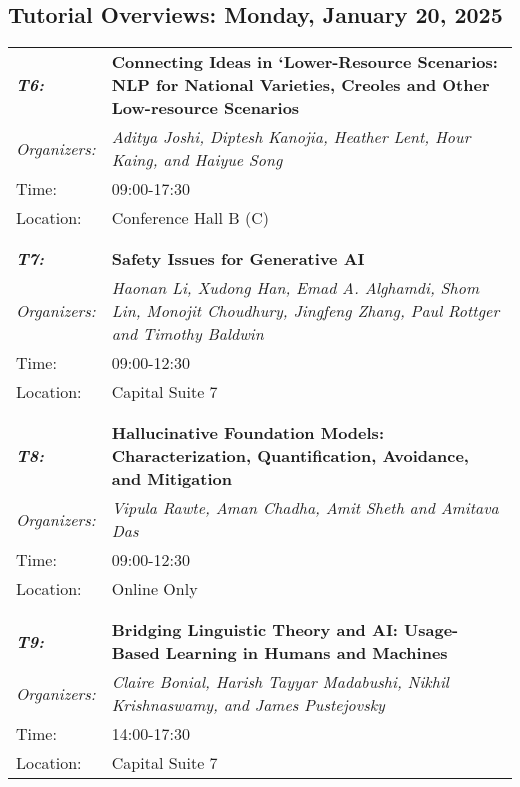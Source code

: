 \subsection{Tutorial Overviews: Monday, January 20, 2025}
\begin{longtable}{p{15mm}p{100mm}}
\emph{\textbf{T6:}} & \textbf{Connecting Ideas in ‘Lower-Resource Scenarios: NLP for National Varieties, Creoles and Other Low-resource Scenarios} \\
\emph{Organizers:} & \emph{Aditya Joshi, Diptesh Kanojia, Heather Lent, Hour Kaing, and Haiyue Song} \\
Time: & 09:00-17:30 \\
Location: & Conference Hall B (C) \\\\
\hline\\
\emph{\textbf{T7:}} & \textbf{Safety Issues for Generative AI} \\
\emph{Organizers:} & \emph{Haonan Li, Xudong Han, Emad A. Alghamdi, Shom Lin, Monojit Choudhury, Jingfeng Zhang, Paul Rottger and Timothy Baldwin} \\
Time: & 09:00-12:30 \\
Location: & Capital Suite 7 \\\\
\hline\\
\emph{\textbf{T8:}} & \textbf{Hallucinative Foundation Models: Characterization, Quantification, Avoidance, and Mitigation} \\
\emph{Organizers:} & \emph{Vipula Rawte, Aman Chadha, Amit Sheth and Amitava Das} \\
Time: & 09:00-12:30 \\
Location: & Online Only \\\\
\hline\\
\emph{\textbf{T9:}} & \textbf{Bridging Linguistic Theory and AI: Usage-Based Learning in Humans and Machines} \\
\emph{Organizers:} & \emph{Claire Bonial, Harish Tayyar Madabushi, Nikhil Krishnaswamy, and James Pustejovsky} \\
Time: & 14:00-17:30 \\
Location: & Capital Suite 7 \\
\end{longtable}